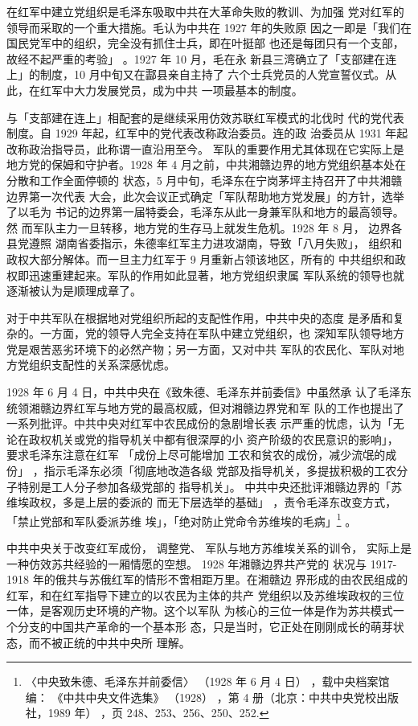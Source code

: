 在红军中建立党组织是毛泽东吸取中共在大革命失败的教训、为加强
党对红军的领导而采取的一个重大措施。毛认为中共在 1927 年的失败原
因之一即是「我们在国民党军中的组织，完全没有抓住士兵，即在叶挺部
也还是每团只有一个支部，故经不起严重的考验」
。1927 年 10 月，毛在永
新县三湾确立了「支部建在连上」的制度，10 月中旬又在酃县亲自主持了
六个士兵党员的人党宣誓仪式。从此，在红军中大力发展党员，成为中共
一项最基本的制度。

与「支部建在连上」相配套的是继续采用仿效苏联红军模式的北伐时
代的党代表制度。自 1929 年起，红军中的党代表改称政治委员。连的政
治委员从 1931 年起改称政治指导员，此称谓一直沿用至今。
军队的重要作用尤其体现在它实际上是地方党的保姆和守护者。1928
年 4 月之前，中共湘赣边界的地方党组织基本处在分散和工作全面停顿的
状态，5 月中旬，毛泽东在宁岗茅坪主持召开了中共湘赣边界第一次代表
大会，此次会议正式确定「军队帮助地方党发展」的方针，选举了以毛为
书记的边界第一届特委会，毛泽东从此一身兼军队和地方的最高领导。然
而军队主力一旦转移，地方党的生存马上就发生危机。1928 年 8 月，
边界各县党遵照
湖南省委指示，朱德率红军主力进攻湖南，导致「八月失败」，
组织和政权大部分解体。而一旦主力红军于 9 月重新占领该地区，所有的
中共组织和政权即迅速重建起来。军队的作用如此显著，地方党组织隶属
军队系统的领导也就逐渐被认为是顺理成章了。

对于中共军队在根据地对党组织所起的支配性作用，中共中央的态度
是矛盾和复杂的。一方面，党的领导人完全支持在军队中建立党组织，也
深知军队领导地方党是艰苦恶劣环境下的必然产物；另一方面，又对中共
军队的农民化、军队对地方党组织支配性的关系深感忧虑。

1928 年 6 月 4 日，中共中央在《致朱德、毛泽东并前委信》中虽然承
认了毛泽东统领湘赣边界红军与地方党的最高权威，但对湘赣边界党和军
队的工作也提出了一系列批评。中共中央对红军中农民成份的急剧增长表
示严重的忧虑，认为「无论在政权机关或党的指导机关中都有很深厚的小
资产阶级的农民意识的影响」， 要求毛泽东注意在红军
「成份上尽可能增加
工农和贫农的成份，减少流氓的成份」
，指示毛泽东必须「彻底地改造各级
党部及指导机关，多提拔积极的工农分子特别是工人分子参加各级党部的
指导机关」。
中共中央还批评湘赣边界的「苏维埃政权，多是上层的委派的
而无下层选举的基础」
，责令毛泽东改变方式，
「禁止党部和军队委派苏维
埃」，「绝对防止党命令苏维埃的毛病」\footnote{ 〈中央致朱德、毛泽东并前委信〉
（1928 年 6 月 4 日）
，载中央档案馆编：
《中共中央文件选集》
（1928）
，第 4
册（北京：中共中央党校出版社，1989 年）
，页 248、253、256、250、252.} 。


中共中央关于改变红军成份，
调整党、
军队与地方苏维埃关系的训令，
实际上是一种仿效苏共经验的一厢情愿的空想。
1928 年湘赣边界共产党的
状况与 1917-1918 年的俄共与苏俄红军的情形不啻相距万里。在湘赣边
界形成的由农民组成的红军，和在红军指导下建立的以农民为主体的共产
党组织以及苏维埃政权的三位一体，是客观历史环境的产物。这个以军队
为核心的三位一体是作为苏共模式一个分支的中国共产革命的一个基本形
态，只是当时，它正处在刚刚成长的萌芽状态，而不被正统的中共中央所
理解。

